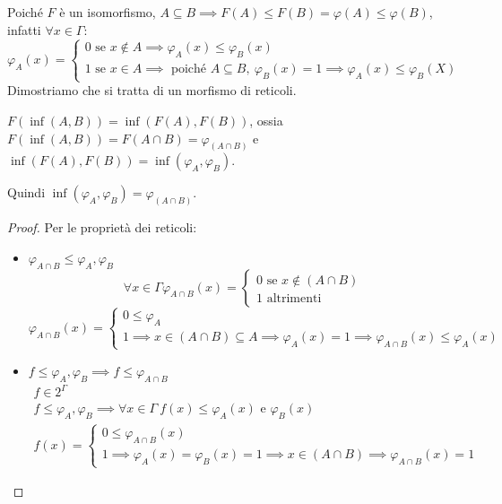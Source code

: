 Poich\'e $F$ \`e un isomorfismo, $A \subseteq B \implies F(A) \le F(B) = \varphi(A) \le \varphi(B)$, infatti $\forall x \in \Gamma$:
\[
\varphi_A(x) = 
\begin{cases}
0 \text{ se } x \notin A \implies \varphi_A(x) \le \varphi_B(x) \\
1 \text{ se } x \in A \implies \text{ poich\'e } A \subseteq B, \ \varphi_B(x) = 1 \implies \varphi_A(x) \le \varphi_B(X)
\end{cases}
\]
Dimostriamo che si tratta di un morfismo di reticoli.
\begin{prop}
$F(\inf(A,B)) = \inf(F(A), F(B))$, ossia $F(\inf(A,B)) = F(A \cap B) = \varphi_{(A \cap B)}$ e $\inf(F(A), F(B)) = \inf(\varphi_A, \varphi_B)$.

Quindi $\inf(\varphi_A, \varphi_B) = \varphi_{(A \cap B)}$.
\end{prop}
\begin{proof}
Per le propriet\`a dei reticoli:
\begin{itemize}
  \item $\varphi_{A \cap B} \le \varphi_A, \varphi_B$
  \[
  \forall x \in \Gamma \varphi_{A \cap B} (x) =
  \begin{cases}
  0 \text{ se } x \notin (A \cap B) \\
  1 \text{ altrimenti}
  \end{cases}
  \]
  \[
  \varphi_{A \cap B} (x) = 
  \begin{cases} 
  0 \le \varphi_A \\
  1 \implies x \in (A \cap B) \subseteq A \implies \varphi_A(x) = 1 \implies \varphi_{A \cap B} (x) \le \varphi_A (x)
  \end{cases}
  \]
  \item $f \le \varphi_A, \varphi_B \implies f \le \varphi_{A \cap B}$
  \begin{gather*}
  f \in 2^{\Gamma} \\
  f \le \varphi_A, \varphi_B \implies
  \forall x \in \Gamma \ f(x) \le 
  \varphi_A(x) 
  \text{ e } 
  \varphi_B(x) \\
  f(x) =
  \begin{cases}
  0 \le \varphi_{A \cap B} (x) \\
  1 \implies \varphi_A (x) = \varphi_B (x) = 1 \implies x \in (A \cap B) \implies \varphi_{A \cap B} (x) = 1
  \end{cases}
  \end{gather*}
\end{itemize}
\end{proof}

